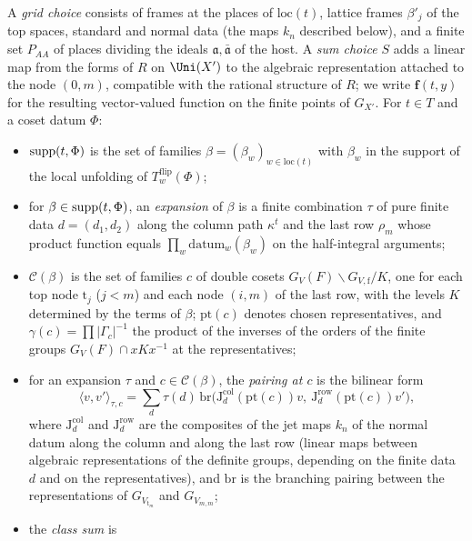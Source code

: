\begin{definition}\label{def:pf:rowprops:classsum}
A \emph{grid choice} consists of frames at the places of $\mathrm{loc}(t)$, lattice frames $\beta'_j$ of the top
spaces, standard and normal data (the maps $k_{n}$ described below), and a finite set $P_{AA}$ of places dividing the
ideals $\mathfrak a,\bar{\mathfrak a}$ of the host. A \emph{sum choice} $S$ adds a linear map from the forms of $R$ on
$\Uni(X')$ to the algebraic representation attached to the node $(0,m)$, compatible with the rational structure of
$R$; we write $\mathbf{f}(t,y)$ for the resulting vector-valued function on the finite points of $G_{X'}$. For
$t\in T$ and a coset datum $\Phi$:
\begin{itemize}
\item $\mathrm{supp}(t,\Phi)$ is the set of families $\beta=(\beta_w)_{w\in\mathrm{loc}(t)}$ with $\beta_w$ in the
support of the local unfolding of $T^{\mathrm{flip}}_w(\Phi)$;
\item for $\beta\in\mathrm{supp}(t,\Phi)$, an \emph{expansion} of $\beta$ is a finite combination $\tau$ of pure finite
data $d=(d_1,d_2)$ along the column path $\kappa^t$ and the last row $\rho_m$ whose product function equals
$\prod_w\mathrm{datum}_w(\beta_w)$ on the half-integral arguments;
\item $\mathcal C(\beta)$ is the set of families $c$ of double cosets $G_V(F)\backslash G_{V,\mathrm f}/K$, one for
each top node $\mathrm t_j$ ($j<m$) and each node $(i,m)$ of the last row, with the levels $K$ determined by the terms of
$\beta$; $\mathrm{pt}(c)$ denotes chosen representatives, and $\gamma(c)=\prod|\Gamma_c|^{-1}$ the product of the
inverses of the orders of the finite groups $G_V(F)\cap xKx^{-1}$ at the representatives;
\item for an expansion $\tau$ and $c\in\mathcal C(\beta)$, the \emph{pairing at $c$} is the bilinear form
\[
\langle v,v'\rangle_{\tau,c}=\sum_d\tau(d)\,\mathrm{br}\bigl(\mathrm{J}^{\mathrm{col}}_d(\mathrm{pt}(c))v,\ \mathrm{J}^{\mathrm{row}}_d(\mathrm{pt}(c))v'\bigr),
\]
where $\mathrm{J}^{\mathrm{col}}_d$ and $\mathrm{J}^{\mathrm{row}}_d$ are the composites of the jet maps $k_n$ of the normal datum along
the column and along the last row (linear maps between algebraic representations of the definite groups, depending on
the finite data $d$ and on the representatives), and $\mathrm{br}$ is the branching pairing between the representations
of $G_{V_{\mathrm t_m}}$ and $G_{V_{m,m}}$;
\item the \emph{class sum} is

\end{itemize}
\end{definition}
